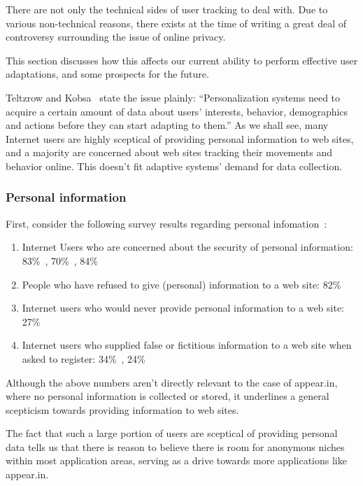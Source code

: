     There are not only the technical sides of user tracking to deal with. Due to various non-technical reasons, there exists at the time of writing a great deal of controversy surrounding the issue of online privacy.

    This section discusses how this affects our current ability to perform effective user adaptations, and some prospects for the future.

    Teltzrow and Kobsa~\cite{Teltzrow2004} state the issue plainly: ``Personalization systems need to acquire a certain amount of data about users' interests, behavior, demographics and actions before they can start adapting to them.'' As we shall see, many Internet users are highly sceptical of providing personal information to web sites, and a majority are concerned about web sites tracking their movements and behavior online. This doesn't fit adaptive systems' demand for data collection.

    \subsubsection{Personal information}

      First, consider the following survey results regarding personal infomation~\cite{Teltzrow2004}:

      \begin{enumerate}
        \item Internet Users who are concerned about the security of personal information: 83\%~\cite{CyberDialogue2001}, 70\%~\cite{Behrens2001}, 84\%~\cite{Fox2000}
        \item People who have refused to give (personal) information to a web site: 82\%~\cite{Culnan2001}
        \item Internet users who would never provide personal information to a web site: 27\%~\cite{Fox2000}
        \item Internet users who supplied false or fictitious information to a web site when asked to register: 34\%~\cite{Culnan2001}, 24\%~\cite{Fox2000}
      \end{enumerate}

      Although the above numbers aren't directly relevant to the case of appear.in, where no personal information is collected or stored, it underlines a general scepticism towards providing information to web sites.

      The fact that such a large portion of users are sceptical of providing personal data tells us that there is reason to believe there is room for anonymous niches within most application areas, serving as a drive towards more applications like appear.in.

